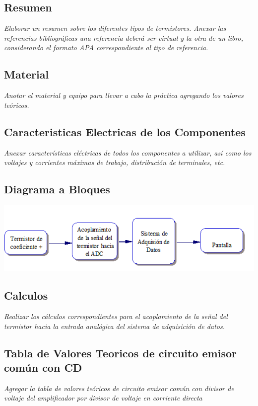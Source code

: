 \documentclass[11pt]{scrartcl}
\newcommand{\indicacion}[1]{\noindent\textit{\small #1}}
\begin{document}
\subsection{Resumen }

\indicacion{
  Elaborar un resumen sobre los diferentes tipos de termistores. Anexar las referencias bibliográficas una referencia deberá ser virtual y la otra de un libro, considerando el formato APA correspondiente al tipo de referencia.
}

\subsection{Material}

\indicacion{
Anotar el material y equipo para llevar a cabo la práctica agregando los valores teóricos.}

\subsection{Caracteristicas Electricas de los Componentes}
\indicacion{
   Anexar características eléctricas de todos los componentes a utilizar, así como los voltajes y corrientes máximas de trabajo, distribución de terminales, etc.
}




\subsection{Diagrama a Bloques}

\begin{center}
    \includegraphics{DiagramaBloques.png}
\end{center}


\subsection{Calculos}
\indicacion{
Realizar los cálculos correspondientes para el acoplamiento de la señal del termistor hacia la entrada analógica del sistema de adquisición de datos.
}


\subsection{Tabla de Valores Teoricos de circuito emisor común con CD}
\indicacion{
Agregar la tabla de valores teóricos de circuito emisor común con divisor de voltaje del amplificador por divisor de voltaje en corriente directa
}
\end{document}
